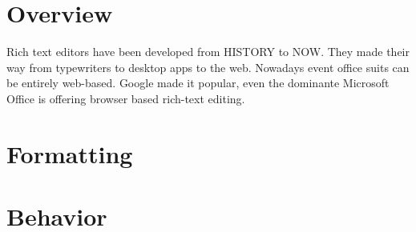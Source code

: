 \section{Overview}

Rich text editors have been developed from HISTORY to NOW. They made their way from typewriters to desktop apps to the web. Nowadays event office suits can be entirely web-based. Google made it popular, even the dominante Microsoft Office is offering browser based rich-text editing.


\section{Formatting}

\section{Behavior}



